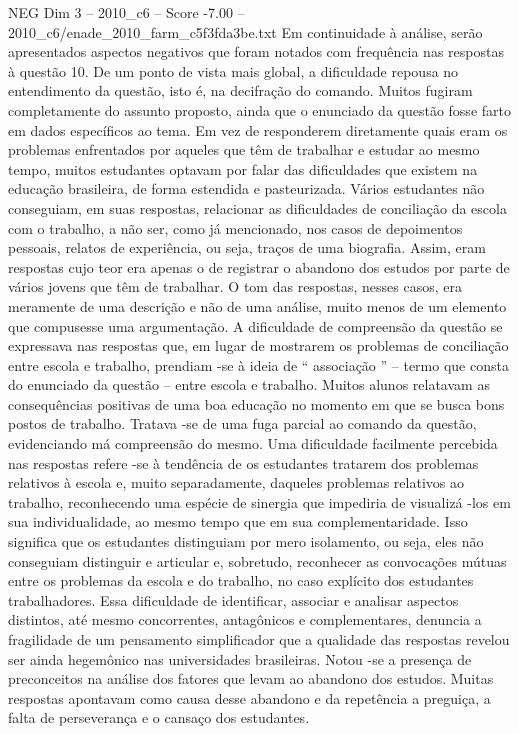 \begin{textsample}{NEG Dim 3 – 2010\_c6 – Score -7.00 – 2010\_c6/enade\_2010\_farm\_c5f3fda3be.txt}
Em continuidade à análise, serão apresentados aspectos negativos que foram notados com frequência nas respostas à questão 10.
De um ponto de vista mais global, a dificuldade repousa no entendimento da questão, isto é, na decifração do comando.
Muitos fugiram completamente do assunto proposto, ainda que o enunciado da questão fosse farto em dados específicos ao tema.
Em vez de responderem diretamente quais eram os problemas enfrentados por aqueles que têm de trabalhar e estudar ao mesmo tempo, muitos estudantes optavam por falar das dificuldades que existem na educação brasileira, de forma estendida e pasteurizada.
Vários estudantes não conseguiam, em suas respostas, relacionar as dificuldades de conciliação da escola com o trabalho, a não ser, como já mencionado, nos casos de depoimentos pessoais, relatos de experiência, ou seja, traços de uma biografia.
Assim, eram respostas cujo teor era apenas o de registrar o abandono dos estudos por parte de vários jovens que têm de trabalhar.
O tom das respostas, nesses casos, era meramente de uma descrição e não de uma análise, muito menos de um elemento que compusesse uma argumentação.
A dificuldade de compreensão da questão se expressava nas respostas que, em lugar de mostrarem os problemas de conciliação entre escola e trabalho, prendiam -se à ideia de “ associação ” – termo que consta do enunciado da questão – entre escola e trabalho.
Muitos alunos relatavam as consequências positivas de uma boa educação no momento em que se busca bons postos de trabalho.
Tratava -se de uma fuga parcial ao comando da questão, evidenciando má compreensão do mesmo.
Uma dificuldade facilmente percebida nas respostas refere -se à tendência de os estudantes tratarem dos problemas relativos à escola e, muito separadamente, daqueles problemas relativos ao trabalho, reconhecendo uma espécie de sinergia que impediria de visualizá -los em sua individualidade, ao mesmo tempo que em sua complementaridade.
Isso significa que os estudantes distinguiam por mero isolamento, ou seja, eles não conseguiam distinguir e articular e, sobretudo, reconhecer as convocações mútuas entre os problemas da escola e do trabalho, no caso explícito dos estudantes trabalhadores.
Essa dificuldade de identificar, associar e analisar aspectos distintos, até mesmo concorrentes, antagônicos e complementares, denuncia a fragilidade de um pensamento simplificador que a qualidade das respostas revelou ser ainda hegemônico nas universidades brasileiras.
Notou -se a presença de preconceitos na análise dos fatores que levam ao abandono dos estudos.
Muitas respostas apontavam como causa desse abandono e da repetência a preguiça, a falta de perseverança e o cansaço dos estudantes.

\end{textsample}
